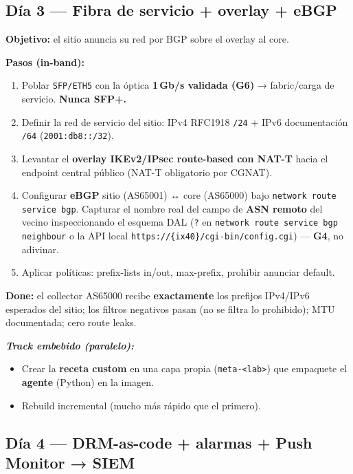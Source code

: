 \documentclass[11pt,a4paper]{article}
\newcommand{\file}[1]{\texttt{#1}}
\newcommand{\gate}[1]{\textbf{G#1}}
\newcommand{\done}{\textbf{Done:}}
\newcommand{\embebido}{\textit{Track embebido (paralelo):}}
\begin{document}
\subsection{Día 3 — Fibra de servicio + overlay + eBGP}

\textbf{Objetivo:} el sitio anuncia su red por BGP sobre el overlay al core.

\textbf{Pasos (in-band):}
\begin{enumerate}
  \item Poblar \file{SFP/ETH5} con la óptica \textbf{1\,Gb/s validada (\gate{6})} →
        fabric/carga de servicio. \textbf{Nunca SFP+.}
  \item Definir la red de servicio del sitio: IPv4 RFC1918 \file{/24} + IPv6 documentación
        \file{/64} (\file{2001:db8::/32}).
  \item Levantar el \textbf{overlay IKEv2/IPsec route-based con NAT-T} hacia el endpoint
        central público (NAT-T obligatorio por CGNAT).
  \item Configurar \textbf{eBGP} sitio (AS65001) ↔ core (AS65000) bajo
        \file{network route service bgp}. Capturar el nombre real del campo de \textbf{ASN remoto}
        del vecino inspeccionando el esquema DAL (\file{?} en
        \file{network route service bgp neighbour} o la API local
        \file{https://\{ix40\}/cgi-bin/config.cgi}) — \textbf{\gate{4}}, no adivinar.
  \item Aplicar políticas: prefix-lists in/out, max-prefix, prohibir anunciar default.
\end{enumerate}

\begin{clave}
\small
\done{} el collector AS65000 recibe \textbf{exactamente} los prefijos IPv4/IPv6 esperados del
sitio; los filtros negativos pasan (no se filtra lo prohibido); MTU documentada;
cero route leaks.
\end{clave}

\textbf{\embebido}
\begin{itemize}
  \item Crear la \textbf{receta custom} en una capa propia (\file{meta-<lab>}) que empaquete el
        \textbf{agente} (Python) en la imagen.
  \item Rebuild incremental (mucho más rápido que el primero).
\end{itemize}

\subsection{Día 4 — DRM-as-code + alarmas + Push Monitor → SIEM}
\end{document}
